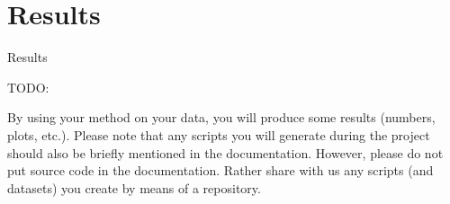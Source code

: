 \chapter{Results}
\label{cha:Results}
Results


TODO:

By using your method on your data, you will produce some
results (numbers, plots, etc.). Please note that any scripts
you will generate during the project should also be briefly
mentioned in the documentation. However, please do not
put source code in the documentation. Rather share with
us any scripts (and datasets) you create by means of a
repository.